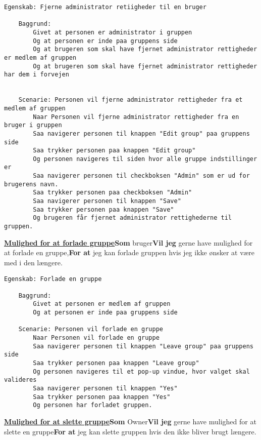 \begin{lstlisting}[language=Gherkin]
Egenskab: Fjerne administrator retiigheder til en bruger

    Baggrund:
        Givet at personen er administrator i gruppen
        Og at personen er inde paa gruppens side
        Og at brugeren som skal have fjernet administrator rettigheder er medlem af gruppen
        Og at brugeren som skal have fjernet administrator rettigheder har dem i forvejen
        
        
    Scenarie: Personen vil fjerne administrator rettigheder fra et medlem af gruppen
        Naar Personen vil fjerne administrator rettigheder fra en bruger i gruppen
        Saa navigerer personen til knappen "Edit group" paa gruppens side
        Saa trykker personen paa knappen "Edit group"
        Og personen navigeres til siden hvor alle gruppe indstillinger er
        Saa navigerer personen til checkboksen "Admin" som er ud for brugerens navn.
        Saa trykker personen paa checkboksen "Admin"
        Saa navigerer personen til knappen "Save"
        Saa trykker personen paa knappen "Save"
        Og brugeren får fjernet administrator rettighederne til gruppen.

\end{lstlisting}

\textbf{\underline{Mulighed for at forlade gruppe}}\newline \textbf{Som} bruger\newline \textbf{Vil jeg} gerne have mulighed for at forlade en gruppe,\newline \textbf{For at} jeg kan forlade gruppen hvis jeg ikke ønsker at være med i den længere.  
\begin{lstlisting}[language=Gherkin]
Egenskab: Forlade en gruppe

    Baggrund:
        Givet at personen er medlem af gruppen
        Og at personen er inde paa gruppens side
        
    Scenarie: Personen vil forlade en gruppe
        Naar Personen vil forlade en gruppe
        Saa navigerer personen til knappen "Leave group" paa gruppens side
        Saa trykker personen paa knappen "Leave group"
        Og personen navigeres til et pop-up vindue, hvor valget skal valideres
        Saa navigerer personen til knappen "Yes"
        Saa trykker personen paa knappen "Yes"
        Og personen har forladet gruppen.

\end{lstlisting}

\textbf{\underline{Mulighed for at slette gruppe}}\newline \textbf{Som} Owner\newline \textbf{Vil jeg} gerne have mulighed for at slette en gruppe\newline \textbf{For at} jeg kan slette gruppen hvis den ikke bliver brugt længere.

